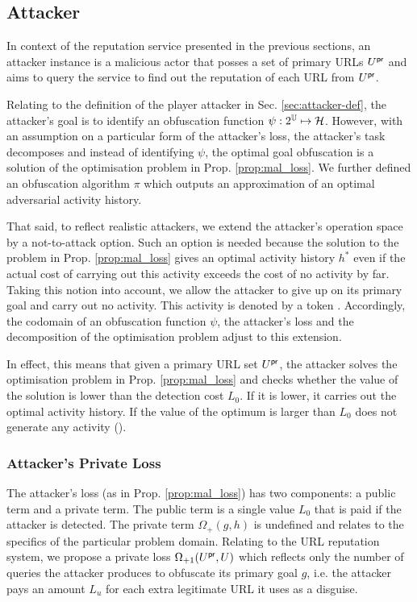 \subsection{Attacker}\label{sec:attacker}
In context of the reputation service presented in the previous sections, an attacker instance is a malicious actor that posses a set of primary URLs $U^{\mathsf{pr}}$ and aims to query the service to find out the reputation of each URL from $U^{\mathsf{pr}}$.

Relating to the definition of the player attacker in Sec. \ref{sec:attacker-def}, the attacker's goal is to identify an obfuscation function
$\psi: 2^{\mathbb{U}} \mapsto \mathcal{H}$. However, with an assumption on a particular form of the attacker's loss, the attacker's task decomposes and instead of identifying $\psi$, the optimal goal obfuscation is a solution of the optimisation problem in Prop. \ref{prop:mal_loss}. We further defined an obfuscation algorithm $\pi$ which outputs an approximation of an optimal adversarial activity history.

That said, to reflect realistic attackers, we extend the attacker's operation space by a not-to-attack option. Such an option is needed because the solution to the problem in Prop. \ref{prop:mal_loss} gives an optimal activity history $h^*$ even if the actual cost of carrying out this activity exceeds the cost of no activity by far. Taking this notion into account, we allow the attacker to give up on its primary goal and carry out no activity. This activity is denoted by a token \NA. Accordingly, the codomain of an obfuscation function $\psi$, the attacker's loss and the decomposition of the optimisation problem adjust to this extension.

In effect, this means that given a primary URL set $U^{\mathsf{pr}}$, the attacker solves the optimisation problem in Prop. \ref{prop:mal_loss} and checks whether the value of the solution is lower than the detection cost $L_0$. If it is lower, it carries out the optimal activity history. If the value of the optimum is larger than $L_0$ does not generate any activity (\NA).

\subsubsection{Attacker's Private Loss}\label{sec:attacker_loss}
The attacker's loss (as in Prop. \ref{prop:mal_loss}) has two components: a public term and a private term. The public term is a single value $L_0$ that is paid if the attacker is detected. The private term $\Omega_\plus(g, h)$ is undefined and relates to the specifics of the particular problem domain. Relating to the URL reputation system, we propose a private loss $\Omega_{{\text{+}1}}(U^{\mathsf{pr}}, U)$ which reflects only the number of queries the attacker produces to obfuscate its primary goal $g$, i.e. the attacker pays an amount $L_u$ for each extra legitimate URL it uses as a disguise.

